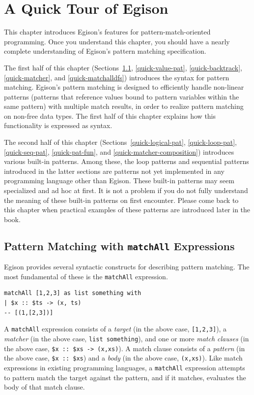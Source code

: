\chapter{A Quick Tour of Egison}\label{quick}

This chapter introduces Egison's features for pattern-match-oriented programming.
Once you understand this chapter, you should have a nearly complete understanding of Egison's pattern matching specification.

The first half of this chapter (Sections~\ref{quick-matchall}, \ref{quick-value-pat}, \ref{quick-backtrack}, \ref{quick-matcher}, and \ref{quick-matchalldfs}) introduces the syntax for pattern matching.
Egison's pattern matching is designed to efficiently handle non-linear patterns (patterns that reference values bound to pattern variables within the same pattern) with multiple match results, in order to realize pattern matching on non-free data types.
The first half of this chapter explains how this functionality is expressed as syntax.

The second half of this chapter (Sections~\ref{quick-logical-pat}, \ref{quick-loop-pat}, \ref{quick-seq-pat}, \ref{quick-pat-fun}, and \ref{quick-matcher-composition}) introduces various built-in patterns.
Among these, the loop patterns and sequential patterns introduced in the latter sections are patterns not yet implemented in any programming language other than Egison.
These built-in patterns may seem specialized and ad hoc at first.
It is not a problem if you do not fully understand the meaning of these built-in patterns on first encounter.
Please come back to this chapter when practical examples of these patterns are introduced later in the book.

\section{Pattern Matching with \texttt{matchAll} Expressions}\label{quick-matchall}

Egison provides several syntactic constructs for describing pattern matching.
The most fundamental of these is the \lstinline{matchAll} expression.
\begin{lstlisting}[language=egison,numbers=none]
matchAll [1,2,3] as list something with
| $x :: $ts -> (x, ts)
-- [(1,[2,3])]
\end{lstlisting}
A \lstinline{matchAll} expression consists of a \emph{target} (in the above case, \lstinline{[1,2,3]}), a \emph{matcher} (in the above case, \lstinline{list something}), and one or more \emph{match clauses} (in the above case, \lstinline{$x :: $xs -> (x,xs)}).
A match clause consists of a \emph{pattern} (in the above case, \lstinline{$x :: $xs}) and a \emph{body} (in the above case, \lstinline{(x,xs)}).
Like match expressions in existing programming languages, a \lstinline{matchAll} expression attempts to pattern match the target against the pattern, and if it matches, evaluates the body of that match clause.

